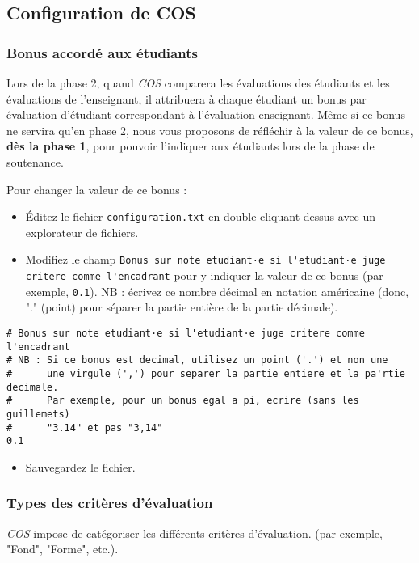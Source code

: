 \documentclass[11pt]{article}
\begin{document}
\subsection{Configuration de COS}
\label{sec-4-1}
\subsubsection{Bonus accordé aux étudiants}
\label{sec-4-1-1}
Lors de la phase 2, quand \emph{COS} comparera les évaluations des
étudiants et les évaluations de l'enseignant, il attribuera à chaque
étudiant un bonus par évaluation d'étudiant correspondant à
l'évaluation enseignant. Même si ce bonus ne servira qu'en phase 2,
nous vous proposons de réfléchir à la valeur de ce bonus, \textbf{dès la
phase 1}, pour pouvoir l'indiquer aux étudiants lors de la phase de
soutenance.

Pour changer la valeur de ce bonus :
\begin{itemize}
\item Éditez le fichier \verb~configuration.txt~ en double-cliquant dessus
avec un explorateur de fichiers.
\item Modifiez le champ \verb~Bonus sur note etudiant·e si l'etudiant·e juge   critere comme l'encadrant~ pour y indiquer la valeur de ce bonus
(par exemple, \verb~0.1~). NB : écrivez ce nombre décimal en notation
américaine (donc, "." (point) pour séparer la partie entière de la
partie décimale).
\end{itemize}
\begin{verbatim}
# Bonus sur note etudiant·e si l'etudiant·e juge critere comme l'encadrant
# NB : Si ce bonus est decimal, utilisez un point ('.') et non une
#      une virgule (',') pour separer la partie entiere et la pa'rtie decimale.
#      Par exemple, pour un bonus egal a pi, ecrire (sans les guillemets)
#      "3.14" et pas "3,14"
0.1
\end{verbatim}
\begin{itemize}
\item Sauvegardez le fichier.
\end{itemize}
\subsubsection{Types des critères d'évaluation}
\label{sec-4-1-2}
\emph{COS} impose de catégoriser les différents critères d'évaluation. (par
exemple, "Fond", "Forme", etc.).
\end{document}
